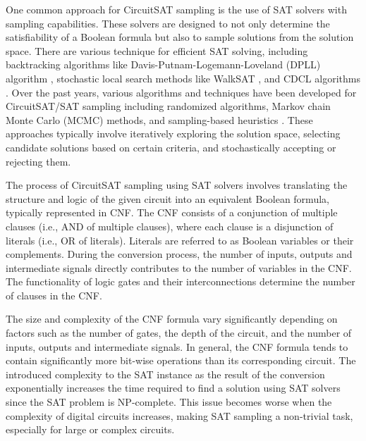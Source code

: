 One common approach for CircuitSAT sampling is the use of SAT solvers with sampling capabilities. These solvers are designed to not only determine the satisfiability of a Boolean formula but also to sample solutions from the solution space. There are various technique for efficient SAT solving, including backtracking algorithms like Davis-Putnam-Logemann-Loveland (DPLL) algorithm \cite{Davis1962DPLL}, stochastic local search methods like WalkSAT \cite{selman1993local}, and CDCL algorithms \cite{Silva1996CDCL, silva2021CDCL}. Over the past years, various algorithms and techniques have been developed for CircuitSAT/SAT sampling including randomized algorithms, Markov chain Monte Carlo (MCMC) methods, and sampling-based heuristics \cite{Impagliazzo2017RandomSAT, kitchen2009markov, Soos2020unigen3, dutra2018quicksampler, Golia2021cmsgen}. These approaches typically involve iteratively exploring the solution space, selecting candidate solutions based on certain criteria, and stochastically accepting or rejecting them. 


The process of CircuitSAT sampling using SAT solvers involves translating the structure and logic of the given circuit into an equivalent Boolean formula, typically represented in CNF. The CNF consists of a conjunction of multiple clauses (i.e., AND of multiple clauses), where each clause is a disjunction of literals (i.e., OR of literals). Literals are referred to as Boolean variables or their complements. During the conversion process, the number of inputs, outputs and intermediate signals directly contributes to the number of variables in the CNF. The functionality of logic gates and their interconnections determine the number of clauses in the CNF. 

The size and complexity of the CNF formula vary significantly depending on factors such as the number of gates, the depth of the circuit, and the number of inputs, outputs and intermediate signals. In general, the CNF formula tends to contain significantly more bit-wise operations than its corresponding circuit. The introduced complexity to the SAT instance as the result of the conversion exponentially increases the time required to find a solution using SAT solvers since the SAT problem is NP-complete. This issue becomes worse when the complexity of digital circuits increases, making SAT sampling a non-trivial task, especially for large or complex circuits.

\vspace{-0.25cm}
